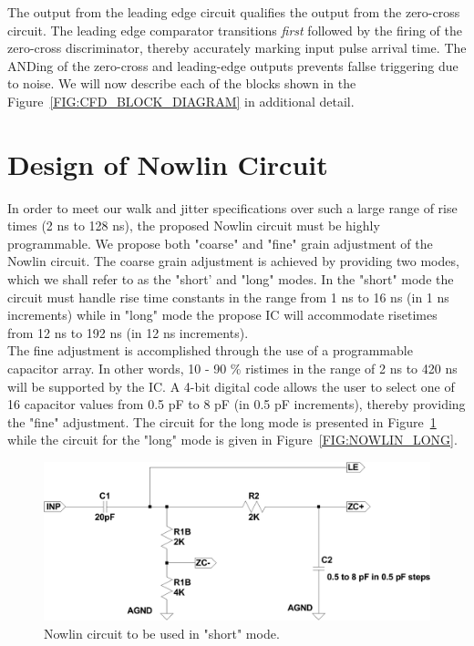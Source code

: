 \documentclass[12pt, onecolumn]{IEEEtran}
\begin{document}
The output from the leading edge circuit qualifies the output from the zero-cross circuit.  The leading edge comparator transitions \emph{first} followed by the firing of the zero-cross discriminator, thereby accurately marking input pulse arrival time. The ANDing of the zero-cross and leading-edge outputs prevents fallse triggering due to noise. We will now describe each of the blocks shown in the Figure~\ref{FIG:CFD_BLOCK_DIAGRAM} in additional detail. \\

\section*{Design of Nowlin Circuit}

In order to meet our walk and jitter specifications over such a large range of rise times (2 ns to 128 ns), the proposed Nowlin circuit must be highly programmable. We propose both "coarse" and "fine" grain adjustment of the Nowlin circuit.  The coarse grain adjustment is achieved by providing two modes, which we shall refer to as  the "short' and "long" modes.  In the "short" mode the circuit must handle rise time constants in the range from 1 ns to 16 ns (in 1 ns increments) while in "long" mode the propose IC will accommodate risetimes from 12 ns to 192 ns (in 12 ns increments). \\

The fine adjustment is accomplished through the use of a programmable capacitor array.  In other words, 10 - 90 \% ristimes in the range of 2 ns to 420 ns will be supported by the IC. A 4-bit digital code allows the user to select one of 16 capacitor values from 0.5 pF to 8 pF (in 0.5 pF increments), thereby providing the "fine" adjustment.  The circuit for the long mode is presented in Figure~\ref{FIG:NOWLIN_SHORT} while the circuit for the "long" mode is given in Figure~\ref{FIG:NOWLIN_LONG}.\\

\begin{figure}[htbp!]
	\centering
 	\includegraphics[scale=0.55,keepaspectratio=true]{./images/nowlin_short.pdf} 	
 	\caption{Nowlin circuit to be used in "short" mode.}
 	\label{FIG:NOWLIN_SHORT}
\end{figure}
\end{document}
